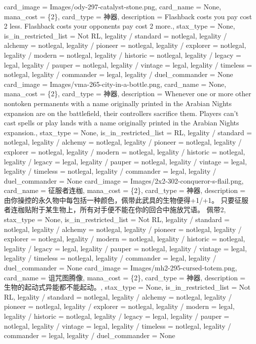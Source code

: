 \documentclass[lang = cn, color = black, 10pt]{AllThatStax}
\begin{document}
\card
{
	card_image = Images/ody-297-catalyst-stone.png,
	card_name = None,
	mana_cost = \{2\},
	card_type = 神器,
	description = Flashback costs you pay cost {2} less.
	Flashback costs your opponents pay cost {2} more.,
	stax_type = None,
	is_in_restricted_list = Not RL,
	legality / standard = notlegal,
	legality / alchemy = notlegal,
	legality / pioneer = notlegal,
	legality / explorer = notlegal,
	legality / modern = notlegal,
	legality / historic = notlegal,
	legality / legacy = legal,
	legality / pauper = notlegal,
	legality / vintage = legal,
	legality / timeless = notlegal,
	legality / commander = legal,
	legality / duel_commander = None
}
\card
{
	card_image = Images/vma-265-city-in-a-bottle.png,
	card_name = None,
	mana_cost = \{2\},
	card_type = 神器,
	description = Whenever one or more other nontoken permanents with a name originally printed in the Arabian Nights expansion are on the battlefield, their controllers sacrifice them.
	Players can't cast spells or play lands with a name originally printed in the Arabian Nights expansion.,
	stax_type = None,
	is_in_restricted_list = RL,
	legality / standard = notlegal,
	legality / alchemy = notlegal,
	legality / pioneer = notlegal,
	legality / explorer = notlegal,
	legality / modern = notlegal,
	legality / historic = notlegal,
	legality / legacy = legal,
	legality / pauper = notlegal,
	legality / vintage = legal,
	legality / timeless = notlegal,
	legality / commander = legal,
	legality / duel_commander = None
}
\card
{
	card_image = Images/2x2-302-conqueror-s-flail.png,
	card_name = 征服者连枷,
	mana_cost = \{2\},
	card_type = 神器,
	description = 由你操控的永久物中每包括一种颜色，佩带此武具的生物便得+1/+1。
	只要征服者连枷贴附于某生物上，所有对手便不能在你的回合中施放咒语。
	佩带{2},
	stax_type = None,
	is_in_restricted_list = Not RL,
	legality / standard = notlegal,
	legality / alchemy = notlegal,
	legality / pioneer = notlegal,
	legality / explorer = notlegal,
	legality / modern = notlegal,
	legality / historic = notlegal,
	legality / legacy = legal,
	legality / pauper = notlegal,
	legality / vintage = legal,
	legality / timeless = notlegal,
	legality / commander = legal,
	legality / duel_commander = None
}
\card
{
	card_image = Images/mh2-295-cursed-totem.png,
	card_name = 诅咒图腾像,
	mana_cost = \{2\},
	card_type = 神器,
	description = 生物的起动式异能都不能起动。,
	stax_type = None,
	is_in_restricted_list = Not RL,
	legality / standard = notlegal,
	legality / alchemy = notlegal,
	legality / pioneer = notlegal,
	legality / explorer = notlegal,
	legality / modern = legal,
	legality / historic = notlegal,
	legality / legacy = legal,
	legality / pauper = notlegal,
	legality / vintage = legal,
	legality / timeless = notlegal,
	legality / commander = legal,
	legality / duel_commander = None
}
\end{document}
